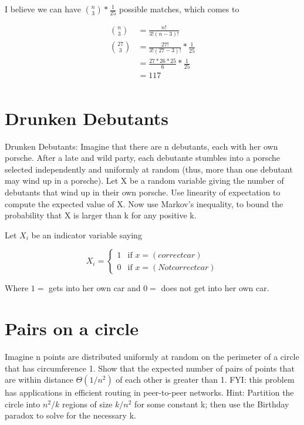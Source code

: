 \documentclass[titlepage]{article}\usepackage[]{graphicx}\usepackage[]{color}
\begin{document}
I believe we can have ${n \choose 3} * \frac{1}{25}$ possible matches, which
comes to 

\begin{align}
{n \choose 3} &= \frac{n!}{3!(n-3)!}  \\
{27 \choose 3} &= \frac{27!}{3!(27-3)!} * \frac{1}{25} \\
&= \frac{27 * 26 * 25}{6} * \frac{1}{25}  \\
&= 117  \\
\end{align}



  \section{ Drunken Debutants}
Drunken Debutants: Imagine that there are n debutants, each with her own
porsche. After a late and wild party, each debutante stumbles into a porsche
selected independently and uniformly at random (thus, more than one debutant
may wind up in a porsche). Let X be a random variable giving the number of
debutants that wind up in their own porsche. Use linearity of expectation to
compute the expected value of X. Now use Markov’s inequality, to bound the
probability that X is larger than k for any positive k.

Let $X_i$ be an indicator variable saying 

\[
 X_i =
  \begin{cases}
   1 & \text{if } x = (correct car) \\
   0       & \text{if } x = (Not correct car)
  \end{cases}
\]

Where $1 = $ gets into her own car and $0=$ does not get into her own car.





  \section{ Pairs on a circle}
Imagine n points are distributed uniformly at random on the perimeter of a
circle that has circumference 1. Show that the expected number of pairs of
points that are within distance $\Theta(1/n^2)$ of each other is greater than 1. FYI:
this problem has applications in efficient routing in peer-to-peer networks.
Hint: Partition the circle into $n^2/k$ regions of size $k/n^2$ for some constant
k; then use the Birthday paradox to solve for the necessary k.

  
\end{document}
